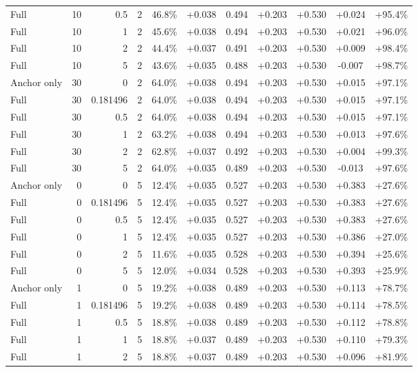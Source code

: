 \begin{table}[htbp]
\begin{tabular}{lrrrccccccc}
Full & 10 & 0.5 & 2 & 46.8\% & +0.038 & 0.494 & +0.203 & +0.530 & +0.024 & +95.4\% \\
Full & 10 & 1 & 2 & 45.6\% & +0.038 & 0.494 & +0.203 & +0.530 & +0.021 & +96.0\% \\
Full & 10 & 2 & 2 & 44.4\% & +0.037 & 0.491 & +0.203 & +0.530 & +0.009 & +98.4\% \\
Full & 10 & 5 & 2 & 43.6\% & +0.035 & 0.488 & +0.203 & +0.530 & -0.007 & +98.7\% \\
Anchor only & 30 & 0 & 2 & 64.0\% & +0.038 & 0.494 & +0.203 & +0.530 & +0.015 & +97.1\% \\
Full & 30 & 0.181496 & 2 & 64.0\% & +0.038 & 0.494 & +0.203 & +0.530 & +0.015 & +97.1\% \\
Full & 30 & 0.5 & 2 & 64.0\% & +0.038 & 0.494 & +0.203 & +0.530 & +0.015 & +97.1\% \\
Full & 30 & 1 & 2 & 63.2\% & +0.038 & 0.494 & +0.203 & +0.530 & +0.013 & +97.6\% \\
Full & 30 & 2 & 2 & 62.8\% & +0.037 & 0.492 & +0.203 & +0.530 & +0.004 & +99.3\% \\
Full & 30 & 5 & 2 & 64.0\% & +0.035 & 0.489 & +0.203 & +0.530 & -0.013 & +97.6\% \\
Anchor only & 0 & 0 & 5 & 12.4\% & +0.035 & 0.527 & +0.203 & +0.530 & +0.383 & +27.6\% \\
Full & 0 & 0.181496 & 5 & 12.4\% & +0.035 & 0.527 & +0.203 & +0.530 & +0.383 & +27.6\% \\
Full & 0 & 0.5 & 5 & 12.4\% & +0.035 & 0.527 & +0.203 & +0.530 & +0.383 & +27.6\% \\
Full & 0 & 1 & 5 & 12.4\% & +0.035 & 0.527 & +0.203 & +0.530 & +0.386 & +27.0\% \\
Full & 0 & 2 & 5 & 11.6\% & +0.035 & 0.528 & +0.203 & +0.530 & +0.394 & +25.6\% \\
Full & 0 & 5 & 5 & 12.0\% & +0.034 & 0.528 & +0.203 & +0.530 & +0.393 & +25.9\% \\
Anchor only & 1 & 0 & 5 & 19.2\% & +0.038 & 0.489 & +0.203 & +0.530 & +0.113 & +78.7\% \\
Full & 1 & 0.181496 & 5 & 19.2\% & +0.038 & 0.489 & +0.203 & +0.530 & +0.114 & +78.5\% \\
Full & 1 & 0.5 & 5 & 18.8\% & +0.038 & 0.489 & +0.203 & +0.530 & +0.112 & +78.8\% \\
Full & 1 & 1 & 5 & 18.8\% & +0.037 & 0.489 & +0.203 & +0.530 & +0.110 & +79.3\% \\
Full & 1 & 2 & 5 & 18.8\% & +0.037 & 0.489 & +0.203 & +0.530 & +0.096 & +81.9\% \\

\end{tabular}
\end{table}
